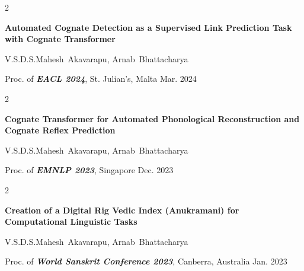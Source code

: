 \documentclass[12pt, letterpaper]{article}
\newenvironment{twocolentry}[2][]{
    \onecolentry
    \def\secondColumn{#2}
    \setcolumnwidth{\fill, 4.5 cm}
    \begin{paracol}{2}
}{
    \switchcolumn \raggedleft \secondColumn
    \end{paracol}
    \endonecolentry
} %
\begin{document}
        \vspace{0.2 cm}

        \begin{samepage}
            \begin{twocolentry}{
                Mar. 2024
            }
                \textbf{Automated Cognate Detection as a Supervised Link Prediction Task with Cognate Transformer}

                \vspace{0.10 cm}

                \mbox{V.S.D.S.Mahesh Akavarapu}, \mbox{Arnab Bhattacharya}
                \vspace{0.10 cm}

        Proc. of \textbf{\textit{EACL 2024}}, St. Julian's, Malta    \end{twocolentry}
        \end{samepage}

        \vspace{0.2 cm}

        \begin{samepage}
            \begin{twocolentry}{
                Dec. 2023
            }
                \textbf{Cognate Transformer for Automated Phonological Reconstruction and Cognate Reflex Prediction}

                \vspace{0.10 cm}

                \mbox{V.S.D.S.Mahesh Akavarapu}, \mbox{Arnab Bhattacharya}
                \vspace{0.10 cm}

        Proc. of \textbf{\textit{EMNLP 2023}}, Singapore    \end{twocolentry}
        \end{samepage}

        \vspace{0.2 cm}

        \begin{samepage}
            \begin{twocolentry}{
                Jan. 2023
            }
                \textbf{Creation of a Digital Rig Vedic Index (Anukramani) for Computational Linguistic Tasks}

                \vspace{0.10 cm}

                \mbox{V.S.D.S.Mahesh Akavarapu}, \mbox{Arnab Bhattacharya}
                \vspace{0.10 cm}

        Proc. of \textbf{\textit{World Sanskrit Conference 2023}}, Canberra, Australia    \end{twocolentry}
        \end{samepage}
\end{document}
